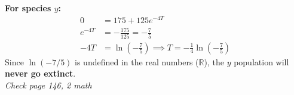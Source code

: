 \smallskip
\noindent \textbf{For species $y$:}
\begin{align*}
    0 &= 175 + 125 e^{-4T} \tag{xiii} \\
    e^{-4T} &= -\frac{175}{125} = -\frac{7}{5} \\
    -4T &= \ln\left(-\frac{7}{5}\right) \implies T = -\frac{1}{4}\ln\left(-\frac{7}{5}\right)
\end{align*}
Since $\ln(-7/5)$ is undefined in the real numbers ($\mathbb{R}$), the $y$ population will \textbf{never go extinct}.\\
\textit{Check page 146, 2 math}